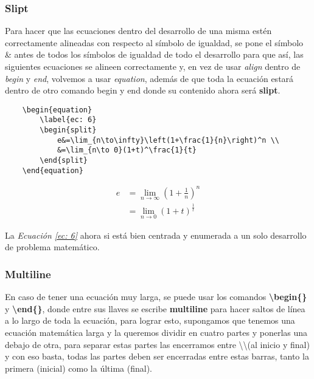 \subsubsection{Slipt}

Para hacer que las ecuaciones dentro del desarrollo de una misma estén correctamente alineadas con respecto al símbolo de igualdad, se pone el símbolo \& antes de todos los símbolos de igualdad de todo el desarrollo para que así, las siguientes ecuaciones se alineen correctamente y, en vez de usar \textit{align} dentro de \textit{begin} y \textit{end}, volvemos a usar \textit{equation}, además de que toda la ecuación estará dentro de otro comando begin y end donde su contenido ahora será \textbf{slipt}.
\begin{lstlisting}
    \begin{equation}
        \label{ec: 6}
        \begin{split}
            e&=\lim_{n\to\infty}\left(1+\frac{1}{n}\right)^n \\
            &=\lim_{n\to 0}(1+t)^\frac{1}{t}
        \end{split}
    \end{equation}
\end{lstlisting}
\begin{equation}
    \label{ec: 6}
    \begin{split}
        e&=\lim_{n\to\infty}\left(1+\frac{1}{n}\right)^n \\
        &=\lim_{n\to 0}(1+t)^\frac{1}{t}
    \end{split}
\end{equation}

La \textit{Ecuación \ref{ec: 6}} ahora si está bien centrada y enumerada a un solo desarrollo de problema matemático.


\subsubsection{Multiline}

En caso de tener una ecuación muy larga, se puede usar los comandos \textbf{\textbackslash{begin\{\}}} y \textbf{\textbackslash{end\{\}}}, donde entre sus llaves se escribe \textbf{multiline} para hacer saltos de línea a lo largo de toda la ecuación, para lograr esto, supongamos que tenemos una ecuación matemática larga y la queremos dividir en cuatro partes y ponerlas una debajo de otra, para separar estas partes las encerramos entre \textbackslash\textbackslash (al inicio y final) y con eso basta, todas las partes deben ser encerradas entre estas barras, tanto la primera (inicial) como la última (final).

